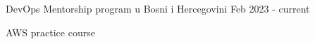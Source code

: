 

\begin{cventries}



    \cventry
    {} %
    {DevOps Mentorship program u Bosni i Hercegovini} %
    {} %
    {Feb 2023 - current} %
    {
      \begin{cvitems} %
          AWS practice course
      \end{cvitems}
    }


\end{cventries}
